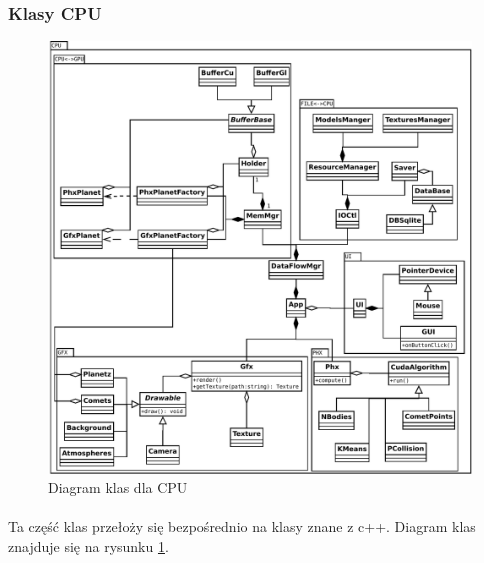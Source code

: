 \subsubsection{Klasy CPU}

\begin{figure}[ht!]
	\centering
	\includegraphics[angle=0,width=\textwidth]{img/class_cpu.pdf}
	\caption{Diagram klas dla CPU}
	\label{fig:class_cpu}
\end{figure}

\paragraph{}
Ta część klas przełoży się bezpośrednio na klasy znane z c++. Diagram klas znajduje się na rysunku \ref{fig:class_cpu}.

